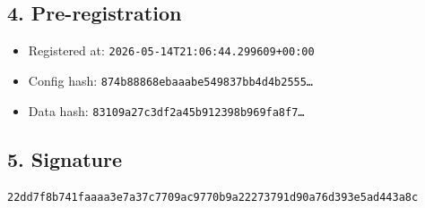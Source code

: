 \documentclass{article}
\begin{document}
\subsection*{4. Pre-registration}
\begin{itemize}
\item Registered at: \texttt{2026-05-14T21:06:44.299609+00:00}
\item Config hash: \texttt{874b88868ebaaabe549837bb4d4b2555\dots}
\item Data hash: \texttt{83109a27c3df2a45b912398b969fa8f7\dots}
\end{itemize}
\subsection*{5. Signature}
\texttt{22dd7f8b741faaaa3e7a37c7709ac9770b9a22273791d90a76d393e5ad443a8c}\\
\end{document}
